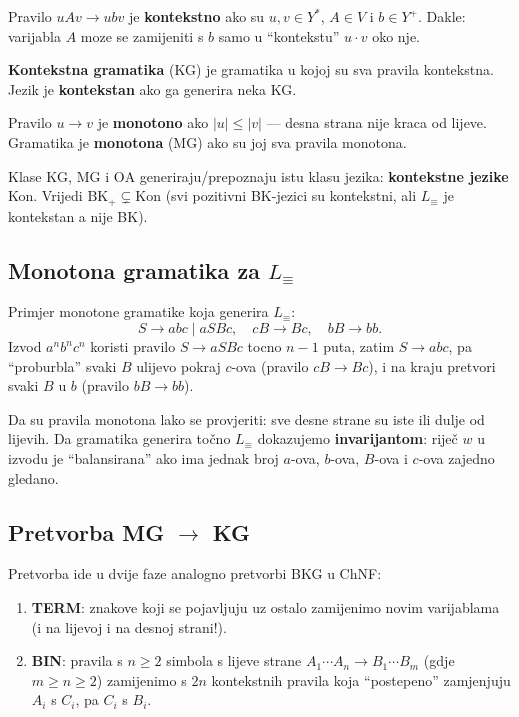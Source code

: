 \begin{definicija}
Pravilo $uAv \to ubv$ je \textbf{kontekstno} ako su
$u, v \in Y^*$, $A \in V$ i $b \in Y^+$. Dakle: varijabla $A$ moze
se zamijeniti s $b$ samo u ``kontekstu'' $u \cdot v$ oko nje.

\textbf{Kontekstna gramatika} (KG) je gramatika u kojoj su sva pravila
kontekstna. Jezik je \textbf{kontekstan} ako ga generira neka KG.
\end{definicija}

\begin{definicija}
Pravilo $u \to v$ je \textbf{monotono} ako $|u| \leq |v|$ --- desna strana
nije kraca od lijeve. Gramatika je \textbf{monotona} (MG) ako su
joj sva pravila monotona.
\end{definicija}

\begin{propozicija}
Klase $\mathrm{KG}$, $\mathrm{MG}$ i $\mathrm{OA}$ generiraju/prepoznaju
istu klasu jezika: \textbf{kontekstne jezike} Kon.
Vrijedi $\mathrm{BK}_+ \subsetneq \mathrm{Kon}$ (svi pozitivni BK-jezici
su kontekstni, ali $L_\equiv$ je kontekstan a nije BK).
\end{propozicija}

\subsection{Monotona gramatika za $L_\equiv$}

Primjer monotone gramatike koja generira $L_\equiv$:
\[
  S \to abc \mid aSBc, \quad cB \to Bc, \quad bB \to bb.
\]
Izvod $a^n b^n c^n$ koristi pravilo $S \to aSBc$ tocno $n-1$ puta,
zatim $S \to abc$, pa ``proburbla'' svaki $B$ ulijevo pokraj $c$-ova
(pravilo $cB \to Bc$), i na kraju pretvori svaki $B$ u $b$ (pravilo $bB \to bb$).

Da su pravila monotona lako se provjeriti: sve desne strane su iste
ili dulje od lijevih. Da gramatika generira točno $L_\equiv$ dokazujemo
\textbf{invarijantom}: riječ $w$ u izvodu je ``balansirana'' ako ima jednak
broj $a$-ova, $b$-ova, $B$-ova i $c$-ova zajedno gledano.

\subsection{Pretvorba MG $\to$ KG}

Pretvorba ide u dvije faze analogno pretvorbi BKG u ChNF:
\begin{enumerate}
  \item \textbf{TERM}: znakove koji se pojavljuju uz ostalo zamijenimo
        novim varijablama (i na lijevoj i na desnoj strani!).
  \item \textbf{BIN}: pravila s $n \geq 2$ simbola s lijeve strane
        $A_1 \cdots A_n \to B_1 \cdots B_m$ (gdje $m \geq n \geq 2$)
        zamijenimo s $2n$ kontekstnih pravila koja ``postepeno''
        zamjenjuju $A_i$ s $C_i$, pa $C_i$ s $B_i$.
\end{enumerate}

